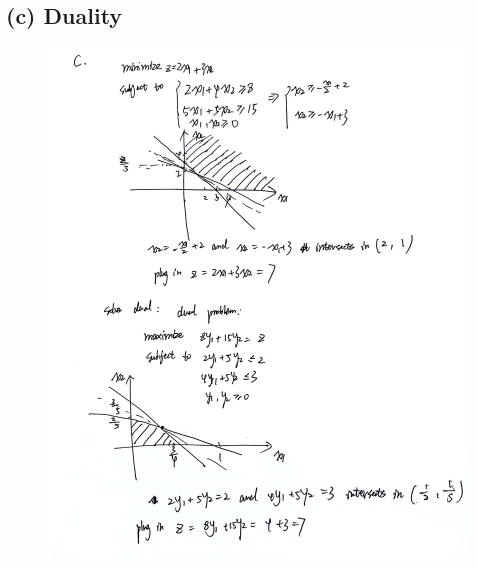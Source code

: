 \documentclass[10pt]{article}
\begin{document}
\subsection*{(c) Duality}

\begin{figure}[H]
  \centering
  \includegraphics[width=\linewidth]{../assets/4.jpg}
\end{figure}
\end{document}

